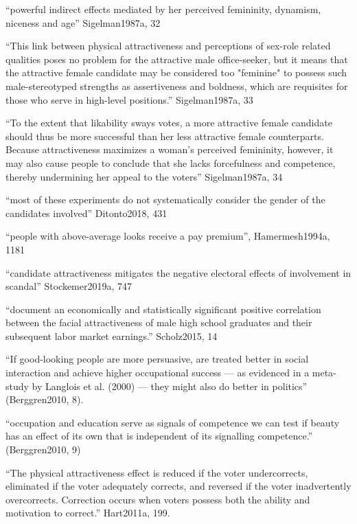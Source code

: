 
``powerful indirect effects mediated by her perceived femininity, dynamism, niceness and age'' Sigelman1987a, 32

``This link between physical attractiveness and perceptions of sex-role related qualities poses no problem for the attractive male office-seeker, but it means that the attractive female candidate may be considered too "feminine" to possess such male-stereotyped strengths as assertiveness and boldness, which are requisites for those who serve in high-level positions.''  Sigelman1987a, 33

``To the extent that likability sways votes, a more attractive female candidate should thus be more successful than her less attractive female counterparts. Because attractiveness maximizes a woman's perceived femininity, however, it may also cause people to conclude that she lacks forcefulness and competence, thereby undermining her appeal to the voters''  Sigelman1987a, 34

``most of these experiments do not systematically consider the gender of the candidates involved'' Ditonto2018, 431




		``people with above-average looks receive a pay premium'', Hamermesh1994a, 1181

		``candidate attractiveness mitigates the negative electoral effects of involvement in scandal'' Stockemer2019a, 747

``document an economically and statistically significant positive correlation between the facial attractiveness of male high school graduates and their subsequent labor market earnings.'' Scholz2015, 14

``If good-looking people are more persuasive, are treated better in social interaction and achieve higher occupational success — as evidenced in a meta-study by Langlois et al. (2000) — they might also do better in politics'' (Berggren2010, 8).

``occupation and education serve as signals of competence we can test if beauty has an effect of its own that is independent of its signalling competence.'' (Berggren2010, 9)

``The physical attractiveness effect is reduced if the voter undercorrects, eliminated if the voter adequately corrects, and reversed if the voter inadvertently overcorrects. Correction occurs when voters possess both the ability and motivation to correct.'' Hart2011a, 199.

